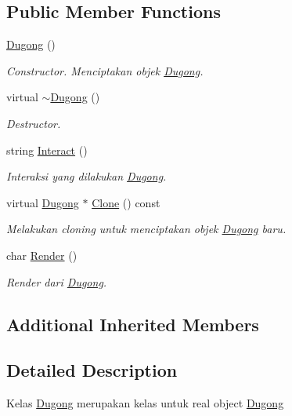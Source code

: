 \subsection*{Public Member Functions}
\begin{DoxyCompactItemize}
\item 
\hyperlink{classDugong_ab18a993807c0daa4b4a7eeaf7118ead7}{Dugong} ()
\begin{DoxyCompactList}\small\item\em Constructor. Menciptakan objek \hyperlink{classDugong}{Dugong}. \end{DoxyCompactList}\item 
virtual \hyperlink{classDugong_a0fe188826a301ecf2b90f2eb60c9e5da}{$\sim$\+Dugong} ()
\begin{DoxyCompactList}\small\item\em Destructor. \end{DoxyCompactList}\item 
string \hyperlink{classDugong_a861c589c05a791faf03297eb6e718d9e}{Interact} ()
\begin{DoxyCompactList}\small\item\em Interaksi yang dilakukan \hyperlink{classDugong}{Dugong}. \end{DoxyCompactList}\item 
virtual \hyperlink{classDugong}{Dugong} $\ast$ \hyperlink{classDugong_a8209b4208bd32dfc0fa4e701679306c1}{Clone} () const 
\begin{DoxyCompactList}\small\item\em Melakukan cloning untuk menciptakan objek \hyperlink{classDugong}{Dugong} baru. \end{DoxyCompactList}\item 
char \hyperlink{classDugong_af82a8983c960604aa27dabe7fec53362}{Render} ()
\begin{DoxyCompactList}\small\item\em Render dari \hyperlink{classDugong}{Dugong}. \end{DoxyCompactList}\end{DoxyCompactItemize}
\subsection*{Additional Inherited Members}


\subsection{Detailed Description}
Kelas \hyperlink{classDugong}{Dugong} merupakan kelas untuk real object \hyperlink{classDugong}{Dugong} 

